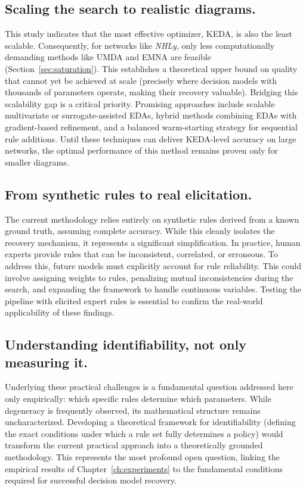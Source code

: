 \subsection{Scaling the search to realistic diagrams.} This study indicates that the most effective optimizer, KEDA, is also the least scalable. Consequently, for networks like \emph{NHLy}, only less computationally demanding methods like UMDA and EMNA are feasible (Section~\ref{sec:saturation}). This establishes a theoretical upper bound on quality that cannot yet be achieved at scale (precisely where decision models with thousands of parameters operate, making their recovery valuable). Bridging this scalability gap is a critical priority. Promising approaches include scalable multivariate or surrogate-assisted EDAs, hybrid methods combining EDAs with gradient-based refinement, and a balanced warm-starting strategy for sequential rule additions. Until these techniques can deliver KEDA-level accuracy on large networks, the optimal performance of this method remains proven only for smaller diagrams.

\subsection{From synthetic rules to real elicitation.} The current methodology relies entirely on synthetic rules derived from a known ground truth, assuming complete accuracy. While this cleanly isolates the recovery mechanism, it represents a significant simplification. In practice, human experts provide rules that can be inconsistent, correlated, or erroneous. To address this, future models must explicitly account for rule reliability. This could involve assigning weights to rules, penalizing mutual inconsistencies during the search, and expanding the framework to handle continuous variables. Testing the pipeline with elicited expert rules is essential to confirm the real-world applicability of these findings.

\subsection{Understanding identifiability, not only measuring it.} Underlying these practical challenges is a fundamental question addressed here only empirically: which specific rules determine which parameters. While degeneracy is frequently observed, its mathematical structure remains uncharacterized. Developing a theoretical framework for identifiability (defining the exact conditions under which a rule set fully determines a policy) would transform the current practical approach into a theoretically grounded methodology. This represents the most profound open question, linking the empirical results of Chapter~\ref{ch:experiments} to the fundamental conditions required for successful decision model recovery.

\nocite{tfm_repo}
